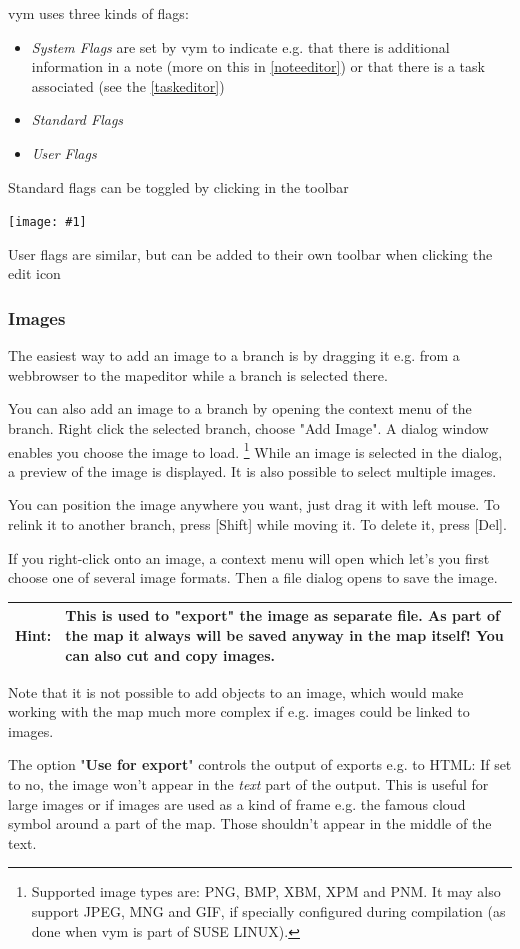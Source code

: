 \documentclass[12pt,a4paper]{article}
\newcommand{\maximage}[1]{  
    \begin{center}
        \texttt{[image: \#1]} 
    \end{center}
}
\newcommand{\hint}[1]{
    \begin{center} 
        \begin{tabular}{|rp{12cm}|} \hline
            {\bf Hint}:& #1\\   \hline
        \end{tabular}
            \marginpar{\Huge !} 
    \end{center} 
}
\newcommand{\vym}{{\sc vym }}
\newcommand{\key}[1]{[#1]}
\begin{document}
\vym uses three kinds of flags: 
\begin{itemize}
    \item {\em System Flags}
        are set by \vym to indicate e.g. that there is additional
        information in a note (more on this in \ref{noteeditor}) or 
        that there is a task associated (see the \ref{taskeditor})
    \item {\em Standard Flags}
    \item {\em User Flags} 
\end{itemize}
Standard flags can be toggled by clicking in the toolbar
    \maximage{images/default-flags.png}
User flags are similar, but can be added to their own toolbar when clicking the edit icon

\subsubsection*{Images}
The easiest way to add an image to a branch is by dragging it e.g. from a
webbrowser to the mapeditor while a branch is selected there.

You can also add an image to a branch by opening the context menu of the
branch. Right click the selected branch, choose "Add Image". A dialog
window enables you choose the image to load. 
\footnote{Supported image types are: PNG, BMP, XBM, XPM and PNM. It may
    also support JPEG, MNG and GIF, if specially configured during
    compilation (as done when \vym is part of SUSE LINUX).}
While an image is selected in the dialog, a preview of the image is
displayed. It is also possible to select multiple images.  

You can position the image anywhere you want, just drag it with left
mouse. To relink it to another branch, press \key{Shift} while moving
it. To delete it, press \key{Del}. 

If you right-click onto an image, a context menu will open which let's
you first choose one of several image formats. Then a file dialog opens
to save the image. 

\hint{ This is used to "export" the image as separate file. As part of
the map it always will be
saved anyway in the map itself! You can also cut and
copy images.}
Note that it is not possible to add objects to an image, which would
make working with the map much more complex if e.g. images could be
linked to images.

The option "{\bf Use for export}" controls the output of exports
e.g. to HTML: If set to no, the image won't appear in the {\em text}
part of the output. This is useful for large images or if images are
used as a kind of frame e.g. the famous cloud symbol around a part of
the map. Those shouldn't appear in the middle of the text.
\end{document}
